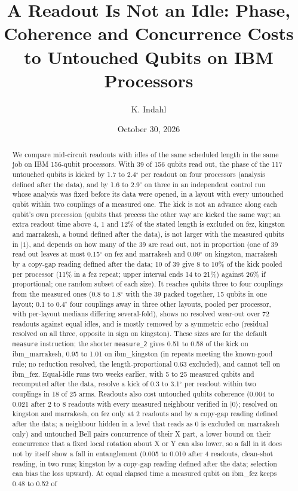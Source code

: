 \documentclass[reprint,amsmath,amssymb,aps,superscriptaddress,nofootinbib]{revtex4-2}
\begin{document}
\title{A Readout Is Not an Idle: Phase, Coherence and Concurrence Costs to Untouched Qubits on IBM Processors}

\author{K. Indahl}

\date{October 30, 2026}

\begin{abstract}
We compare mid-circuit readouts with idles of the same scheduled length in the same job on IBM 156-qubit processors. With 39 of 156 qubits read out, the phase of the 117 untouched qubits is kicked by 1.7 to 2.4$^\circ$ per readout on four processors (analysis defined after the data), and by 1.6 to 2.9$^\circ$ on three in an independent control run whose analysis was fixed before its data were opened, in a layout with every untouched qubit within two couplings of a measured one. The kick is not an advance along each qubit's own precession (qubits that precess the other way are kicked the same way; an extra readout time above 4, 1 and 12\% of the stated length is excluded on fez, kingston and marrakesh, a bound defined after the data), is not larger with the measured qubits in $|1\rangle$, and depends on how many of the 39 are read out, not in proportion (one of 39 read out leaves at most 0.15$^\circ$ on fez and marrakesh and 0.09$^\circ$ on kingston, marrakesh by a copy-gap reading defined after the data; 10 of 39 give 8 to 10\% of the kick pooled per processor (11\% in a fez repeat; upper interval ends 14 to 21\%) against 26\% if proportional; one random subset of each size). It reaches qubits three to four couplings from the measured ones (0.8 to 1.8$^\circ$ with the 39 packed together, 15 qubits in one layout; 0.1 to 0.4$^\circ$ four couplings away in three other layouts, pooled per processor, with per-layout medians differing several-fold), shows no resolved wear-out over 72 readouts against equal idles, and is mostly removed by a symmetric echo (residual resolved on all three, opposite in sign on kingston). These sizes are for the default \texttt{measure} instruction; the shorter \texttt{measure\_2} gives 0.51 to 0.58 of the kick on ibm\_marrakesh, 0.95 to 1.01 on ibm\_kingston (in repeats meeting the known-good rule; no reduction resolved, the length-proportional 0.63 excluded), and cannot tell on ibm\_fez. Equal-idle runs two weeks earlier, with 5 to 25 measured qubits and recomputed after the data, resolve a kick of 0.3 to 3.1$^\circ$ per readout within two couplings in 18 of 25 arms. Readouts also cost untouched qubits coherence (0.004 to 0.021 after 2 to 8 readouts with every measured neighbour verified in $|0\rangle$; resolved on kingston and marrakesh, on fez only at 2 readouts and by a copy-gap reading defined after the data; a neighbour hidden in a level that reads as 0 is excluded on marrakesh only) and untouched Bell pairs concurrence of their X part, a lower bound on their concurrence that a fixed local rotation about X or Y can also lower, so a fall in it does not by itself show a fall in entanglement (0.005 to 0.010 after 4 readouts, clean-shot reading, in two runs; kingston by a copy-gap reading defined after the data; selection can bias the loss upward). At equal elapsed time a measured qubit on ibm\_fez keeps 0.48 to 0.52 of 
\end{abstract}
\end{document}
